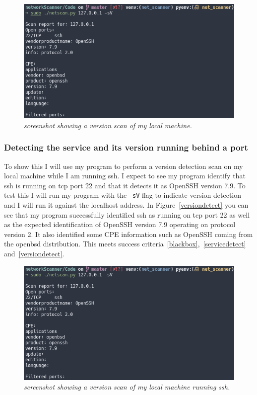 \documentclass[titlepage]{article}
\let\Oldsubsubsection\subsubsection{}
\renewcommand{\subsubsection}{\FloatBarrier\Oldsubsubsection}
\begin{document}
\begin{figure}[H]
  \centering
  \includegraphics[width=\textwidth]{sshversiondetect.png}
  \caption{\textit{%
    screenshot showing a version scan of my local machine.
}}\label{sshversiondetect}
\end{figure}

\subsubsection{Detecting the service and its version running behind a port}
To show this I will use my program to perform a version detection scan on my local machine
while I am running \gls{ssh}. I expect to see my program identify that \gls{ssh} is running
on \gls{tcp} port 22 and that it detects it as OpenSSH version 7.9. To test this
I will run my program with the \verb|-sV| flag to indicate version detection and
I will run it against the localhost address. In Figure~\ref{versiondetect}
you can see that my program successfully identified \gls{ssh} as running on
\gls{tcp} port 22 as well as the expected identification of OpenSSH version 7.9
operating on protocol version 2.
It also identified some CPE information such as OpenSSH coming from the openbsd
distribution.
This meets success criteria~\ref{blackbox},~\ref{servicedetect} and~\ref{versiondetect}.

\begin{figure}[H]
  \centering
  \includegraphics[width=\textwidth]{sshversiondetect.png}
  \caption{\textit{%
    screenshot showing a version scan of my local machine running ssh.
}}\label{versiondetecttest}
\end{figure}
\end{document}
